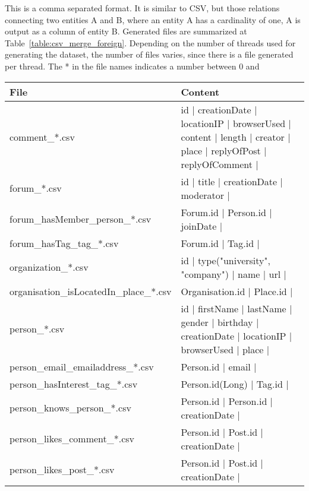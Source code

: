 This is a comma separated format. It is similar to CSV, but those relations
connecting two entities A and B, where an entity A has a cardinality of one, A
is output as a column of entity B. Generated files are summarized at
Table~\ref{table:csv_merge_foreign}. Depending on the number of threads used for generating
the dataset, the number of files varies, since there is a file generated per
thread. The * in the file names indicates a number between 0 and

\begin{landscape}
    \begin{table}[t]
        \footnotesize
        \centering
        \begin{tabular}{|p{5cm}|p{19cm}|}
            \hline
            \textbf{File} & \textbf{Content} \\
            \hline
            comment\_*.csv & id | creationDate | locationIP | browserUsed | content | length | creator | place | replyOfPost | replyOfComment |\\
            \hline
            forum\_*.csv & id | title | creationDate | moderator |\\
            \hline
            forum\_hasMember\_person\_*.csv & Forum.id | Person.id | joinDate |\\
            \hline
            forum\_hasTag\_tag\_*.csv & Forum.id | Tag.id |\\
            \hline
            organization\_*.csv & id | type({"university", "company"}) | name | url |\\
            \hline
            organisation\_isLocatedIn\_place\_*.csv & Organisation.id | Place.id |\\
            \hline
            person\_*.csv & id | firstName | lastName | gender | birthday | creationDate | locationIP | browserUsed | place |\\ 
            \hline
            person\_email\_emailaddress\_*.csv & Person.id | email |\\
            \hline
            person\_hasInterest\_tag\_*.csv &  Person.id(Long) | Tag.id |\\
            \hline
            person\_knows\_person\_*.csv & Person.id | Person.id  | creationDate |\\
            \hline
            person\_likes\_comment\_*.csv & Person.id | Post.id | creationDate |\\
            \hline
            person\_likes\_post\_*.csv & Person.id | Post.id | creationDate |\\

\end{tabular}
\end{table}
\end{landscape}
